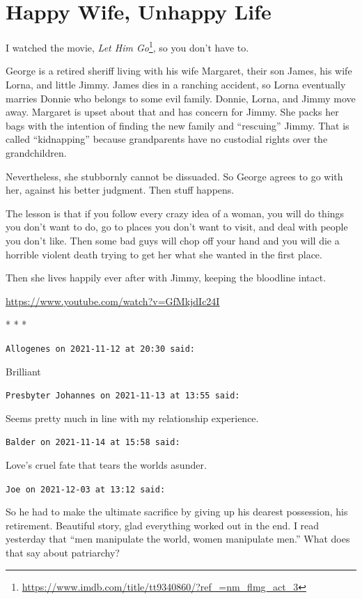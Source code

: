 \section{Happy Wife, Unhappy Life}

I watched the movie, \textit{Let Him Go}\footnote{\url{https://www.imdb.com/title/tt9340860/?ref_=nm_flmg_act_3}}, so you don't have to.


George is a retired sheriff living with his wife Margaret, their son James, his wife Lorna, and little Jimmy. James dies in a ranching accident, so Lorna eventually marries Donnie who belongs to some evil family. Donnie, Lorna, and Jimmy move away. Margaret is upset about that and has concern for Jimmy. She packs her bags with the intention of finding the new family and ``rescuing'' Jimmy. That is called ``kidnapping'' because grandparents have no custodial rights over the grandchildren.

Nevertheless, she stubbornly cannot be dissuaded. So George agrees to go with her, against his better judgment. Then stuff happens.

The lesson is that if you follow every crazy idea of a woman, you will do things you don't want to do, go to places you don't want to visit, and deal with people you don't like. Then some bad guys will chop off your hand and you will die a horrible violent death trying to get her what she wanted in the first place.

Then she lives happily ever after with Jimmy, keeping the bloodline intact.

\url{https://www.youtube.com/watch?v=GfMkjdIc24I} 


\begin{center}* * *\end{center}

\begin{footnotesize}
\begin{sffamily}
\texttt{Allogenes on 2021-11-12 at 20:30 said:}

Brilliant

\hfill

\texttt{Presbyter Johannes on 2021-11-13 at 13:55 said:}

Seems pretty much in line with my relationship experience.

\hfill

\texttt{Balder on 2021-11-14 at 15:58 said:}

Love's cruel fate that tears the worlds asunder.

\hfill

\texttt{Joe on 2021-12-03 at 13:12 said:}

So he had to make the ultimate sacrifice by giving up his dearest possession, his retirement. Beautiful story, glad everything worked out in the end. I read yesterday that ``men manipulate the world, women manipulate men.'' What does that say about patriarchy?

\end{sffamily}
\end{footnotesize}


